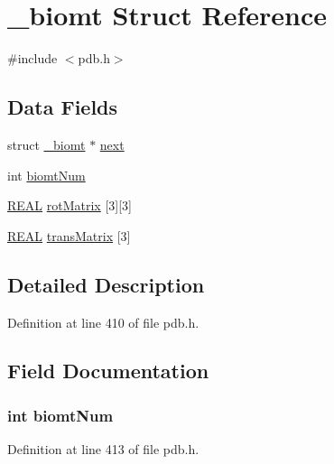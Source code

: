 \hypertarget{struct__biomt}{\section{\-\_\-biomt Struct Reference}
\label{struct__biomt}
}


{\ttfamily \#include $<$pdb.\-h$>$}

\subsection*{Data Fields}
\begin{DoxyCompactItemize}
\item 
struct \hyperlink{struct__biomt}{\-\_\-biomt} $\ast$ \hyperlink{struct__biomt_a7e81b9381876e459056d51ea11f4c45b}{next}
\item 
int \hyperlink{struct__biomt_acb863268ec184d6b03f6d9fcf367d960}{biomt\-Num}
\item 
\hyperlink{_math_type_8h_a5821460e95a0800cf9f24c38915cbbde}{R\-E\-A\-L} \hyperlink{struct__biomt_a7e607adbc99d6e07fbee835a8c1aa9e5}{rot\-Matrix} \mbox{[}3\mbox{]}\mbox{[}3\mbox{]}
\item 
\hyperlink{_math_type_8h_a5821460e95a0800cf9f24c38915cbbde}{R\-E\-A\-L} \hyperlink{struct__biomt_a2b495a90c016d85049bbe560e41545b6}{trans\-Matrix} \mbox{[}3\mbox{]}
\end{DoxyCompactItemize}


\subsection{Detailed Description}


Definition at line 410 of file pdb.\-h.



\subsection{Field Documentation}
\hypertarget{struct__biomt_acb863268ec184d6b03f6d9fcf367d960}{
\subsubsection[{biomt\-Num}]{\setlength{\rightskip}{0pt plus 5cm}int biomt\-Num}}\label{struct__biomt_acb863268ec184d6b03f6d9fcf367d960}


Definition at line 413 of file pdb.\-h.

